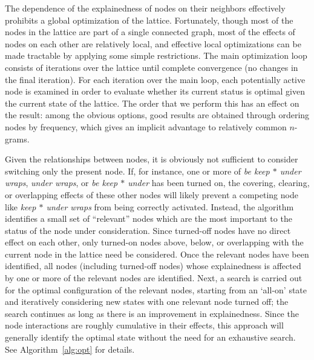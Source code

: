 \documentclass[11pt,letterpaper]{article}
\newcommand{\gap}{$*$\xspace}
\newcommand{\ex}[1]{\textit{#1}\xspace}
\newcommand{\algoref}[2][]{Algorithm#1~\ref{#2}\xspace}
\begin{document}
The dependence of the explainedness of nodes on their neighbors effectively prohibits a global optimization of the lattice. Fortunately, though most of the nodes in the lattice are part of a single connected graph, most of the effects of nodes on each other are relatively local, and effective local optimizations can be made tractable by applying some simple restrictions. The main optimization loop consists of iterations over the lattice until complete convergence (no changes in the final iteration). For each iteration over the main loop, each potentially active node is examined in order to evaluate whether its current status is optimal given the current state of the lattice. The order that we perform this has an effect on the result: among the obvious options, good results are obtained through ordering nodes by frequency, which gives an implicit advantage to relatively common $n$-grams.

Given the relationships between nodes, it is obviously not sufficient to consider switching only the present node. If, for instance, one or more of \ex{be keep \gap under wraps}, \ex{under wraps}, or \ex{be keep \gap under} has been turned on, the covering, clearing, or overlapping effects of these other nodes will likely prevent a competing node like \ex{keep \gap under wraps} from being correctly activated. Instead, the algorithm identifies a small set of ``relevant'' nodes which are the most important to the status of the node under consideration. Since turned-off nodes have no direct effect on each other, only turned-on nodes above, below, or overlapping with the current node in the lattice need be considered.  Once the relevant nodes have been identified, all nodes (including turned-off nodes) whose explainedness is affected by one or more of the relevant nodes are identified. Next, a search is carried out for the optimal configuration of the relevant nodes, starting from an `all-on' state and  iteratively considering new states with one relevant node turned off; the search continues as long as there is an improvement in explainedness. Since the node interactions are roughly cumulative in their effects, this approach will generally identify the optimal state without the need for an exhaustive search. See \algoref{alg:opt} for details.
\end{document}
